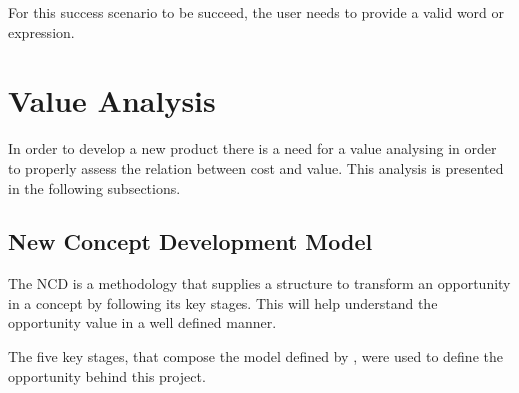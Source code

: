 For this success scenario to be succeed, the user needs to provide a valid word or expression.

\section{Value Analysis}

In order to develop a new product there is a need for a value analysing in order to properly assess the relation between cost and value.
This analysis is presented in the following subsections. 

\subsection{New Concept Development Model}

The \gls{NCD} \autocite{koen_2001} is a methodology that supplies a structure to transform an opportunity in a concept by following its key stages.
This will help understand the opportunity value in a well defined manner.

The five key stages, that compose the model defined by \textcite{koen_2001}, were used to define the opportunity behind this project.

